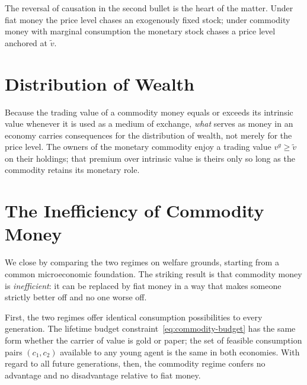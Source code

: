The reversal of causation in the second bullet is the heart of the matter. Under fiat money the price level chases an exogenously fixed stock; under commodity money with marginal consumption the monetary stock chases a price level anchored at $\tilde v$.

\section{Distribution of Wealth}

Because the trading value of a commodity money equals or exceeds its intrinsic value whenever it is used as a medium of exchange, \emph{what} serves as money in an economy carries consequences for the distribution of wealth, not merely for the price level. The owners of the monetary commodity enjoy a trading value $v^g \ge \tilde v$ on their holdings; that premium over intrinsic value is theirs only so long as the commodity retains its monetary role.


\section{The Inefficiency of Commodity Money}

We close by comparing the two regimes on welfare grounds, starting from a common microeconomic foundation. The striking result is that commodity money is \emph{inefficient}: it can be replaced by fiat money in a way that makes someone strictly better off and no one worse off.

First, the two regimes offer identical consumption possibilities to every generation. The lifetime budget constraint~\eqref{eq:commodity-budget} has the same form whether the carrier of value is gold or paper; the set of feasible consumption pairs $(c_1, c_2)$ available to any young agent is the same in both economies. With regard to all future generations, then, the commodity regime confers no advantage and no disadvantage relative to fiat money.

